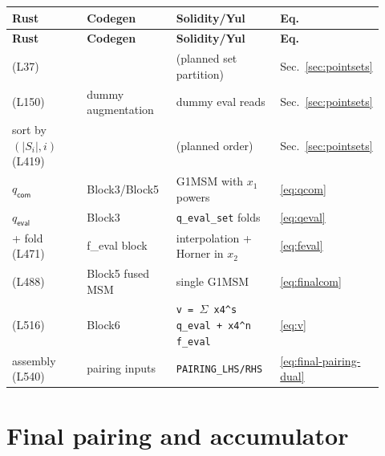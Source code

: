 \begin{longtable}{@{}L{0.26\linewidth}L{0.26\linewidth}L{0.30\linewidth}L{0.10\linewidth}@{}}
\toprule
\textbf{Rust} & \textbf{Codegen} & \textbf{Solidity/Yul} & \textbf{Eq.} \\
\midrule
\endfirsthead
\toprule
\textbf{Rust} & \textbf{Codegen} & \textbf{Solidity/Yul} & \textbf{Eq.} \\
\midrule
\endhead
{} (L37) &
   &
  (planned set partition) &
  Sec.~\ref{sec:pointsets} \\
 (L150) &
   dummy augmentation &
  dummy eval reads &
  Sec.~\ref{sec:pointsets} \\
sort by $(|S_i|, i)$ (L419) &
   &
  (planned order) &
  Sec.~\ref{sec:pointsets} \\
 $q_{\mathsf{com}}$ &
   Block3/Block5 &
  G1MSM with $x_1$ powers &
  \eqref{eq:qcom} \\
 $q_{\mathsf{eval}}$ &
   Block3 &
  \texttt{q\_\allowbreak{}eval\_\allowbreak{}set} folds &
  \eqref{eq:qeval} \\
 + fold (L471) &
   f\_\allowbreak{}eval block &
  interpolation + Horner in $x_2$ &
  \eqref{eq:feval} \\
 (L488) &
   Block5 fused MSM &
  single G1MSM &
  \eqref{eq:finalcom} \\
 (L516) &
   Block6 &
  \texttt{v = $\Sigma$ x4\^{}s q\_\allowbreak{}eval + x4\^{}n f\_\allowbreak{}eval} &
  \eqref{eq:v} \\
 assembly (L540) &
   pairing inputs &
  \texttt{PAIRING\_\allowbreak{}LHS/RHS} &
  \eqref{eq:final-pairing-dual} \\
\bottomrule
\end{longtable}

\section{Final pairing and accumulator}
\label{sec:corr-pairing}

